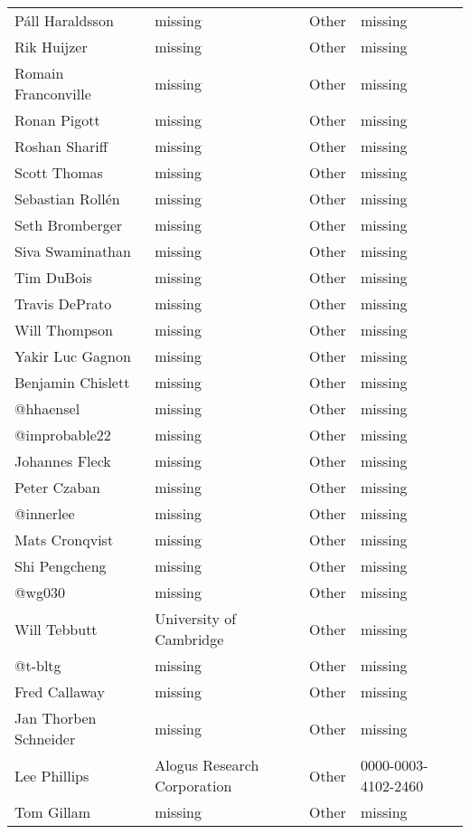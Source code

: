 \begin{longtable}{p{4cm}p{4cm}ll}
  Páll Haraldsson & missing & Other & missing \\
  Rik Huijzer & missing & Other & missing \\
  Romain Franconville & missing & Other & missing \\
  Ronan Pigott & missing & Other & missing \\
  Roshan Shariff & missing & Other & missing \\
  Scott Thomas & missing & Other & missing \\
  Sebastian Rollén & missing & Other & missing \\
  Seth Bromberger & missing & Other & missing \\
  Siva Swaminathan & missing & Other & missing \\
  Tim DuBois & missing & Other & missing \\
  Travis DePrato & missing & Other & missing \\
  Will Thompson & missing & Other & missing \\
  Yakir Luc Gagnon & missing & Other & missing \\
  Benjamin Chislett & missing & Other & missing \\
  @hhaensel & missing & Other & missing \\
  @improbable22 & missing & Other & missing \\
  Johannes Fleck & missing & Other & missing \\
  Peter Czaban & missing & Other & missing \\
  @innerlee & missing & Other & missing \\
  Mats Cronqvist & missing & Other & missing \\
  Shi Pengcheng & missing & Other & missing \\
  @wg030 & missing & Other & missing \\
  Will Tebbutt & University of Cambridge & Other & missing \\
  @t-bltg & missing & Other & missing \\
  Fred Callaway & missing & Other & missing \\
  Jan Thorben Schneider & missing & Other & missing \\
  Lee Phillips & Alogus Research Corporation & Other & 0000-0003-4102-2460 \\
  Tom Gillam & missing & Other & missing \\\hline\hline
\end{longtable}
